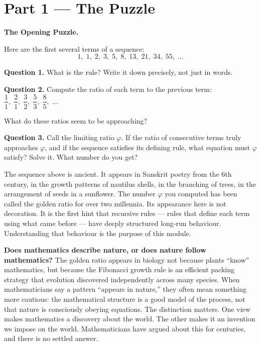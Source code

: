 \documentclass[12pt, a4paper]{article}
\begin{document}
\newpage

\section{Part 1 \texorpdfstring{---}{--} The Puzzle}

\begin{puzzlebox}
\textbf{The Opening Puzzle.}

Here are the first several terms of a sequence:
\[
1,\; 1,\; 2,\; 3,\; 5,\; 8,\; 13,\; 21,\; 34,\; 55,\; \ldots
\]

\textbf{Question 1.} What is the rule? Write it down precisely, not just in words.

\textbf{Question 2.} Compute the ratio of each term to the previous term:
$\dfrac{1}{1},\; \dfrac{2}{1},\; \dfrac{3}{2},\; \dfrac{5}{3},\; \dfrac{8}{5},\; \ldots$

What do these ratios seem to be approaching?

\textbf{Question 3.} Call the limiting ratio $\varphi$. If the ratio of consecutive terms truly approaches $\varphi$, and if the sequence satisfies its defining rule, what equation must $\varphi$ satisfy? Solve it. What number do you get?
\end{puzzlebox}

\medskip
The sequence above is ancient. It appears in Sanskrit poetry from the 6th century, in the growth patterns of nautilus shells, in the branching of trees, in the arrangement of seeds in a sunflower. The number $\varphi$ you computed has been called the golden ratio for over two millennia. Its appearance here is not decoration. It is the first hint that recursive rules --- rules that define each term using what came before --- have deeply structured long-run behaviour. Understanding that behaviour is the purpose of this module.

\begin{thought}
\textbf{Does mathematics describe nature, or does nature follow mathematics?}
The golden ratio appears in biology not because plants ``know'' mathematics, but because the Fibonacci growth rule is an efficient packing strategy that evolution discovered independently across many species. When mathematicians say a pattern ``appears in nature,'' they often mean something more cautious: the mathematical structure is a good model of the process, not that nature is consciously obeying equations. The distinction matters. One view makes mathematics a discovery about the world. The other makes it an invention we impose on the world. Mathematicians have argued about this for centuries, and there is no settled answer.
\end{thought}
\end{document}
